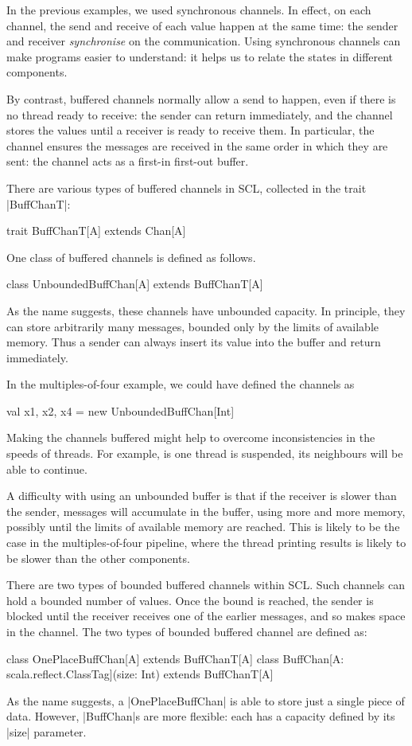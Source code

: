 In the previous examples, we used synchronous channels.  In effect, on each
channel, the send and receive of each value happen at the same time: the
sender and receiver \emph{synchronise} on the communication.
%
Using synchronous channels can make programs easier to understand: it helps us
to relate the states in different components.

By contrast, buffered channels normally allow a
send to happen, even if there is no thread ready to receive: the sender can
return immediately, and the channel stores the values until a receiver is
ready to receive them.  In particular, the channel ensures the messages are
received in the same order in which they are sent: the channel acts as a
first-in first-out buffer.

There are various types of buffered channels in SCL, collected in the trait
|BuffChanT|: 
\begin{scala}
trait BuffChanT[A] extends Chan[A]
\end{scala}
%
One class of buffered channels is defined as
follows. 
%
\begin{scala}
class UnboundedBuffChan[A] extends BuffChanT[A]
\end{scala}
%
As the name suggests, these channels have unbounded capacity. In principle,
they can store arbitrarily many messages, bounded only by the limits of
available memory.  Thus a sender can always insert its value into the buffer
and return immediately. 

In the multiples-of-four example, we could have defined the channels as 
%
\begin{scala}
  val x1, x2, x4 = new UnboundedBuffChan[Int]
\end{scala}
%
Making the channels buffered might help to overcome inconsistencies in the
speeds of threads.  For example, is one thread is suspended, its neighbours
will be able to continue.

A difficulty with using an unbounded buffer is that if the receiver is slower
than the sender, messages will accumulate in the buffer, using more and more
memory, possibly until the limits of available memory are reached.  This is
likely to be the case in the multiples-of-four pipeline, where the thread
printing results is likely to be slower than the other components. 

There are two types of bounded buffered channels within SCL\@.  Such channels
can hold a bounded number of values.  Once the bound is reached, the sender is
blocked until the receiver receives one of the earlier messages, and so makes
space in the channel.
%
The two types of bounded buffered channel are defined
as:
%
\begin{scala}
class OnePlaceBuffChan[A] extends BuffChanT[A]
class BuffChan[A: scala.reflect.ClassTag](size: Int) extends BuffChanT[A]
\end{scala}
%
As the name suggests, a |OnePlaceBuffChan| is able to store just a single
piece of data.  However, |BuffChan|s are more flexible: each has a capacity
defined by its |size| parameter.

